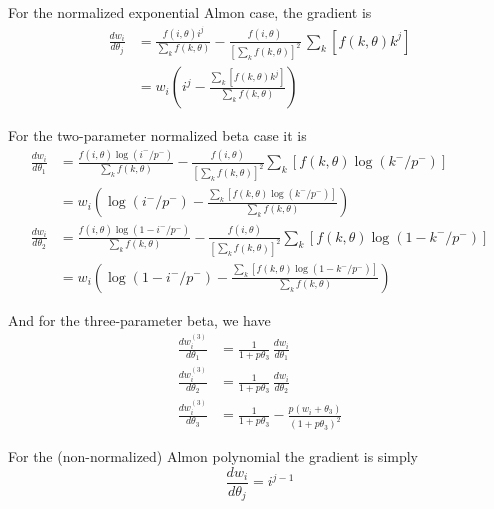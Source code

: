 For the normalized exponential Almon case, the gradient is
\begin{align*}
\frac{dw_i}{d\theta_j} &= 
\frac{f(i, \theta) i^j}{\sum_kf(k, \theta)} - 
\frac{f(i, \theta)}{\left[\sum_kf(k, \theta)\right]^2}
\, \sum_k\left[f(k, \theta) k^j\right] \\[4pt]
 &= w_i \left(i^j - 
\frac{\sum_k\left[f(k,\theta)k^j\right]}{\sum_k f(k, \theta)}\right)
\end{align*}

For the two-parameter normalized beta case it is
\begin{align*}
\frac{dw_i}{d\theta_1} &=
\frac{f(i,\theta) \log(i^-/p^-)}{\sum_k f(k, \theta)} -
\frac{f(i,\theta)}{\left[\sum_k f(k,\theta)\right]^2}
\sum_k\left[f(k,\theta) \log(k^-/p^-)\right] \\[4pt]
&= w_i \left(\log(i^-/p^-) - 
\frac{\sum_k\left[f(k,\theta) \log(k^-/p^-)\right]}{\sum_k 
 f(k,\theta)}\right) \\[8pt]
\frac{dw_i}{d\theta_2} &=
\frac{f(i,\theta) \log(1 - i^-/p^-)}{\sum_k f(k, \theta)} -
\frac{f(i,\theta)}{\left[\sum_k f(k,\theta)\right]^2}
\sum_k\left[f(k,\theta) \log(1 - k^-/p^-)\right] \\[4pt]
&= w_i \left(\log(1 - i^-/p^-) - 
\frac{\sum_k\left[f(k,\theta) \log(1 - k^-/p^-)\right]}{\sum_k 
 f(k,\theta)}\right)
\end{align*}

And for the three-parameter beta, we have
\begin{align*}
\frac{dw^{(3)}_i}{d\theta_1} &= 
  \frac{1}{1+p\theta_3} \, \frac{dw_i}{d\theta_1} \\
\frac{dw^{(3)}_i}{d\theta_2} &= 
  \frac{1}{1+p\theta_3} \, \frac{dw_i}{d\theta_2} \\
\frac{dw^{(3)}_i}{d\theta_3} &=
\frac{1}{1+p\theta_3} - \frac{p(w_i + \theta_3)}{(1+p\theta_3)^2}
\end{align*}

For the (non-normalized) Almon polynomial the gradient is simply
\[
\frac{dw_i}{d\theta_j} = i^{j-1}
\]

